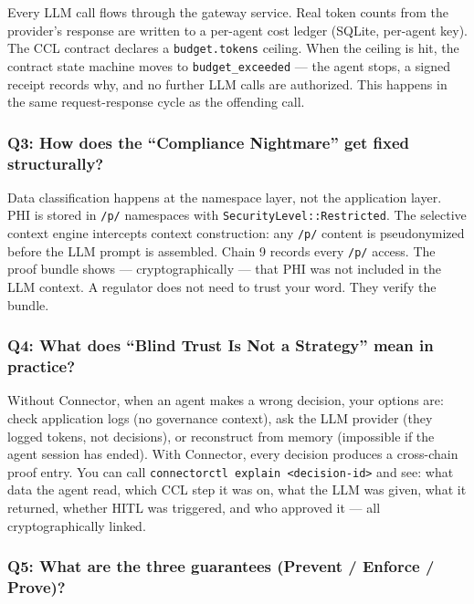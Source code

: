 \documentclass[11pt,a4paper]{article}
\begin{document}
Every LLM call flows through the gateway service. Real token counts from the provider's response
are written to a per-agent cost ledger (SQLite, per-agent key). The CCL contract declares a
\texttt{budget.tokens} ceiling. When the ceiling is hit, the contract state machine moves to
\texttt{budget\_exceeded} — the agent stops, a signed receipt records why, and no further
LLM calls are authorized. This happens in the same request-response cycle as the offending call.

\subsubsection*{Q3: How does the ``Compliance Nightmare'' get fixed structurally?}

Data classification happens at the namespace layer, not the application layer.
PHI is stored in \texttt{/p/} namespaces with \texttt{SecurityLevel::Restricted}.
The selective context engine intercepts context construction: any \texttt{/p/} content is
pseudonymized before the LLM prompt is assembled. Chain 9 records every \texttt{/p/} access.
The proof bundle shows — cryptographically — that PHI was not included in the LLM context.
A regulator does not need to trust your word. They verify the bundle.

\subsubsection*{Q4: What does ``Blind Trust Is Not a Strategy'' mean in practice?}

Without Connector, when an agent makes a wrong decision, your options are: check application logs
(no governance context), ask the LLM provider (they logged tokens, not decisions), or reconstruct
from memory (impossible if the agent session has ended). With Connector, every decision produces
a cross-chain proof entry. You can call \texttt{connectorctl explain <decision-id>} and see:
what data the agent read, which CCL step it was on, what the LLM was given, what it returned,
whether HITL was triggered, and who approved it — all cryptographically linked.

\subsubsection*{Q5: What are the three guarantees (Prevent / Enforce / Prove)?}
\end{document}
